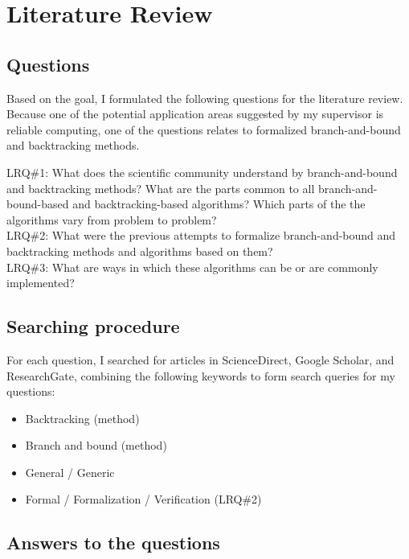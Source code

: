 \chapter{Literature Review}
\label{chap:lr}

\section{Questions}

Based on the goal, I formulated the following questions for the literature review. Because one
of the potential application areas suggested by my supervisor is reliable computing, one of
the questions relates to formalized branch-and-bound and backtracking methods.

LRQ\#1: What does the scientific community understand by branch-and-bound and backtracking methods?
What are the parts common to all branch-and-bound-based and backtracking-based algorithms?
Which parts of the the algorithms vary from problem to problem? \\

LRQ\#2: What were the previous attempts to formalize branch-and-bound and backtracking methods
and algorithms based on them? \\

LRQ\#3: What are ways in which these algorithms can be or are commonly implemented? \\

\section{Searching procedure}

For each question, I searched for articles in ScienceDirect,
Google Scholar, and ResearchGate, combining the following keywords to form search queries
for my questions:

\begin{itemize}
    \item Backtracking (method)
    \item Branch and bound (method)
    \item General / Generic
    \item Formal / Formalization / Verification (LRQ\#2)
\end{itemize}

\section{Answers to the questions}

